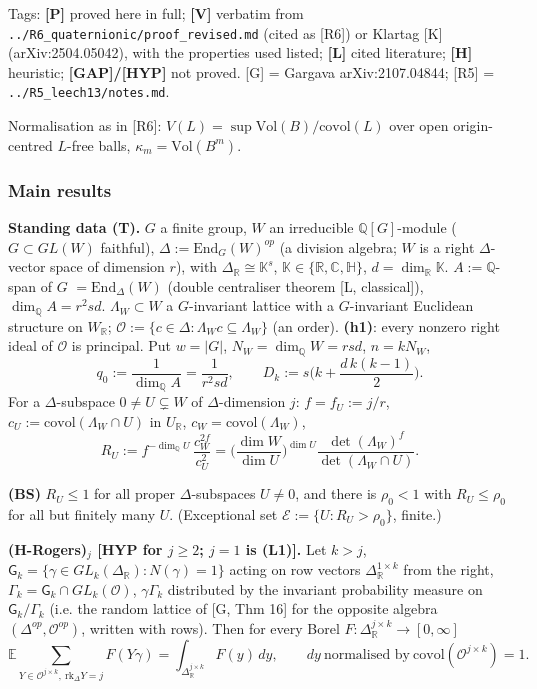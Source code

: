 Tags: \textbf{{[}P{]}} proved here in full; \textbf{{[}V{]}} verbatim from \texttt{../R6\_quaternionic/proof\_revised.md} (cited as {[}R6{]}) or Klartag {[}K{]} (arXiv:2504.05042), with the properties used listed; \textbf{{[}L{]}} cited literature; \textbf{{[}H{]}} heuristic; \textbf{{[}GAP{]}/{[}HYP{]}} not proved. {[}G{]} = Gargava arXiv:2107.04844; {[}R5{]} = \texttt{../R5\_leech13/notes.md}.

Normalisation as in {[}R6{]}: \(V(L)=\sup \mathrm{Vol}(B)/\mathrm{covol}(L)\) over open origin-centred \(L\)-free balls, \(\kappa_m=\mathrm{Vol}(B^m)\).

\hypertarget{main-results}{%
\subsubsection*{Main results}\label{main-results}}

\textbf{Standing data (T).} \(G\) a finite group, \(W\) an irreducible \(\mathbb Q[G]\)-module (\(G\subset GL(W)\) faithful), \(\Delta:=\mathrm{End}_G(W)^{op}\) (a division algebra; \(W\) is a right \(\Delta\)-vector space of dimension \(r\)), with \(\Delta_{\mathbb R}\cong\mathbb K^s\), \(\mathbb K\in\{\mathbb R,\mathbb C,\mathbb H\}\), \(d=\dim_{\mathbb R}\mathbb K\). \(A:=\mathbb Q\)-span of \(G\) \(=\mathrm{End}_\Delta(W)\) (double centraliser theorem {[}L, classical{]}), \(\dim_{\mathbb Q}A=r^2sd\). \(\Lambda_W\subset W\) a \(G\)-invariant lattice with a \(G\)-invariant Euclidean structure on \(W_{\mathbb R}\); \(\mathcal O:=\{c\in\Delta:\Lambda_Wc\subseteq\Lambda_W\}\) (an order). \textbf{(h1)}: every nonzero right ideal of \(\mathcal O\) is principal. Put \(w=|G|\), \(N_W=\dim_{\mathbb Q}W=rsd\), \(n=kN_W\),
\[q_0:=\frac1{\dim_{\mathbb Q}A}=\frac1{r^2sd},\qquad D_k:=s\Big(k+\frac{d\,k(k-1)}2\Big).\]
For a \(\Delta\)-subspace \(0\ne U\subsetneq W\) of \(\Delta\)-dimension \(j\): \(f=f_U:=j/r\), \(c_U:=\mathrm{covol}(\Lambda_W\cap U)\) in \(U_{\mathbb R}\), \(c_W=\mathrm{covol}(\Lambda_W)\),
\[R_U:=f^{-\dim_{\mathbb Q}U}\,\frac{c_W^{2f}}{c_U^{2}}=\Big(\frac{\dim W}{\dim U}\Big)^{\dim U}\frac{\det(\Lambda_W)^{f}}{\det(\Lambda_W\cap U)} .\]

\textbf{(BS)} \(R_U\le1\) for all proper \(\Delta\)-subspaces \(U\neq0\), and there is \(\rho_0<1\) with \(R_U\le\rho_0\) for all but finitely many \(U\). (Exceptional set \(\mathcal E:=\{U:R_U>\rho_0\}\), finite.)

\textbf{(H-Rogers)\(_{j}\) {[}HYP for \(j\ge2\); \(j=1\) is (L1){]}.} Let \(k>j\), \(\mathsf G_k=\{\gamma\in GL_k(\Delta_{\mathbb R}):N(\gamma)=1\}\) acting on row vectors \(\Delta_{\mathbb R}^{1\times k}\) from the right, \(\Gamma_k=\mathsf G_k\cap GL_k(\mathcal O)\), \(\gamma\Gamma_k\) distributed by the invariant probability measure on \(\mathsf G_k/\Gamma_k\) (i.e. the random lattice of {[}G, Thm 16{]} for the opposite algebra \((\Delta^{op},\mathcal O^{op})\), written with rows). Then for every Borel \(F:\Delta_{\mathbb R}^{j\times k}\to[0,\infty]\)
\[\mathbb E\sum_{Y\in\mathcal O^{j\times k},\ \mathrm{rk}_\Delta Y=j}F(Y\gamma)=\int_{\Delta_{\mathbb R}^{j\times k}}F(y)\,dy,\qquad dy\ \text{normalised by}\ \mathrm{covol}(\mathcal O^{j\times k})=1 .\]

